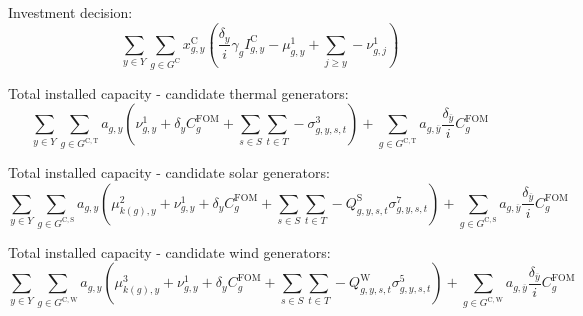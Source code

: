 \documentclass{article}
\newcommand{\sGeneratorsCandidate}{G^{\mathrm{C}}}
\newcommand{\sGeneratorsCandidateThermal}{G^{\mathrm{C,T}}}
\newcommand{\sGeneratorsCandidateWind}{G^{\mathrm{C,W}}}
\newcommand{\sGeneratorsCandidateSolar}{G^{\mathrm{C,S}}}
\newcommand{\sYears}{Y}
\newcommand{\sScenarios}{S}
\newcommand{\sIntervals}{T}
\newcommand{\iGenerator}{g}
\newcommand{\iYear}{y}
\newcommand{\iYearTerminal}{\overline{\iYear}}
\newcommand{\iYearAlias}{j}
\newcommand{\iScenario}{s}
\newcommand{\iInterval}{t}
\newcommand{\iZone}{z}
\newcommand{\cFixedOperationsMaintenanceCostGenerator}[1][\iGenerator]{C^{\mathrm{FOM}}_{#1}}
\newcommand{\cAmortisationRate}[1][\iGenerator]{\gamma_{#1}}
\newcommand{\cCandidateInvestmentCost}[1][\iGenerator,\iYear]{I^{\mathrm{C}}_{#1}}
\newcommand{\cInterestRate}{i}
\newcommand{\cCapacityFactorWind}[1][\iGenerator,\iYear,\iScenario,\iInterval]{Q_{#1}^{\mathrm{W}}}
\newcommand{\cCapacityFactorSolar}[1][\iGenerator,\iYear,\iScenario,\iInterval]{Q_{#1}^{\mathrm{S}}}
\newcommand{\cDiscountRate}[1][\iYear]{\delta_{#1}}
\newcommand{\vInstalledCapacity}[1][\iGenerator,\iYear]{x^{\mathrm{C}}_{#1}}
\newcommand{\vInstalledCapacityTotal}[1][\iGenerator,\iYear]{a_{#1}}
\newcommand{\dNonNegativeCandidateCapacity}[1][\iGenerator,\iYear]{\mu_{#1}^{1}}
\newcommand{\dSolarBuildLimit}[1][\iZone,\iYear]{\mu_{#1}^{2}}
\newcommand{\dWindBuildLimit}[1][\iZone,\iYear]{\mu_{#1}^{3}}
\newcommand{\dTotalInstallCapacity}[1][\iGenerator,\iYear]{\nu_{#1}^{1}}
\newcommand{\dMaxPowerOutputCandidateThermal}[1][\iGenerator,\iYear,\iScenario,\iInterval]{\sigma_{#1}^{3}}
\newcommand{\dMaxPowerOutputWindCandidate}[1][\iGenerator,\iYear,\iScenario,\iInterval]{\sigma_{#1}^{5}}
\newcommand{\dMaxPowerOutputSolarCandidate}[1][\iGenerator,\iYear,\iScenario,\iInterval]{\sigma_{#1}^{7}}
\begin{document}
Investment decision:
\begin{equation}
	\sum\limits_{\iYear \in \sYears} \sum\limits_{\iGenerator \in \sGeneratorsCandidate} \vInstalledCapacity \left(\frac{\cDiscountRate}{\cInterestRate} \cAmortisationRate \cCandidateInvestmentCost - \dNonNegativeCandidateCapacity + \sum\limits_{\iYearAlias \geq \iYear} -\dTotalInstallCapacity[\iGenerator,\iYearAlias] \right)
\end{equation}

Total installed capacity - candidate thermal generators:
\begin{equation}
\sum\limits_{\iYear \in \sYears} \sum\limits_{\iGenerator \in \sGeneratorsCandidateThermal} \vInstalledCapacityTotal \left(\dTotalInstallCapacity + \cDiscountRate \cFixedOperationsMaintenanceCostGenerator + \sum\limits_{\iScenario \in \sScenarios}\sum\limits_{\iInterval \in \sIntervals} - \dMaxPowerOutputCandidateThermal \right) + \sum\limits_{\iGenerator \in \sGeneratorsCandidateThermal} \vInstalledCapacityTotal[\iGenerator,\iYearTerminal] \frac{\cDiscountRate[\iYearTerminal]}{\cInterestRate} \cFixedOperationsMaintenanceCostGenerator
\end{equation}

Total installed capacity - candidate solar generators:
\begin{equation}
	\sum\limits_{\iYear \in \sYears} \sum\limits_{\iGenerator \in \sGeneratorsCandidateSolar} \vInstalledCapacityTotal \left(\dSolarBuildLimit[k(\iGenerator),\iYear] + \dTotalInstallCapacity + \cDiscountRate \cFixedOperationsMaintenanceCostGenerator + \sum\limits_{\iScenario \in \sScenarios}\sum\limits_{\iInterval \in \sIntervals} - \cCapacityFactorSolar \dMaxPowerOutputSolarCandidate \right) + \sum\limits_{\iGenerator \in \sGeneratorsCandidateSolar} \vInstalledCapacityTotal[\iGenerator,\iYearTerminal] \frac{\cDiscountRate[\iYearTerminal]}{\cInterestRate} \cFixedOperationsMaintenanceCostGenerator
\end{equation}

Total installed capacity - candidate wind generators:
\begin{equation}
\sum\limits_{\iYear \in \sYears} \sum\limits_{\iGenerator \in \sGeneratorsCandidateWind} \vInstalledCapacityTotal \left(\dWindBuildLimit[k(\iGenerator),\iYear] + \dTotalInstallCapacity + \cDiscountRate \cFixedOperationsMaintenanceCostGenerator + \sum\limits_{\iScenario \in \sScenarios}\sum\limits_{\iInterval \in \sIntervals} - \cCapacityFactorWind \dMaxPowerOutputWindCandidate \right) + \sum\limits_{\iGenerator \in \sGeneratorsCandidateWind} \vInstalledCapacityTotal[\iGenerator,\iYearTerminal] \frac{\cDiscountRate[\iYearTerminal]}{\cInterestRate} \cFixedOperationsMaintenanceCostGenerator
\end{equation}
\end{document}
